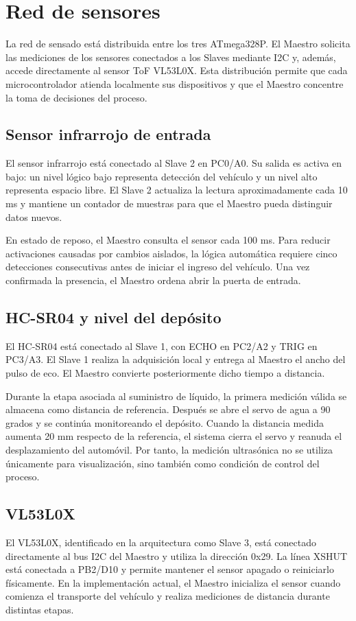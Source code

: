 \section{Red de sensores}

La red de sensado está distribuida entre los tres ATmega328P. El Maestro solicita las mediciones de los sensores conectados a los Slaves mediante I2C y, además, accede directamente al sensor ToF VL53L0X. Esta distribución permite que cada microcontrolador atienda localmente sus dispositivos y que el Maestro concentre la toma de decisiones del proceso.

\subsection{Sensor infrarrojo de entrada}
El sensor infrarrojo está conectado al Slave 2 en PC0/A0. Su salida es activa en bajo: un nivel lógico bajo representa detección del vehículo y un nivel alto representa espacio libre. El Slave 2 actualiza la lectura aproximadamente cada 10 ms y mantiene un contador de muestras para que el Maestro pueda distinguir datos nuevos.

En estado de reposo, el Maestro consulta el sensor cada 100 ms. Para reducir activaciones causadas por cambios aislados, la lógica automática requiere cinco detecciones consecutivas antes de iniciar el ingreso del vehículo. Una vez confirmada la presencia, el Maestro ordena abrir la puerta de entrada.

\subsection{HC-SR04 y nivel del depósito}
El HC-SR04 está conectado al Slave 1, con ECHO en PC2/A2 y TRIG en PC3/A3. El Slave 1 realiza la adquisición local y entrega al Maestro el ancho del pulso de eco. El Maestro convierte posteriormente dicho tiempo a distancia.

Durante la etapa asociada al suministro de líquido, la primera medición válida se almacena como distancia de referencia. Después se abre el servo de agua a 90 grados y se continúa monitoreando el depósito. Cuando la distancia medida aumenta 20 mm respecto de la referencia, el sistema cierra el servo y reanuda el desplazamiento del automóvil. Por tanto, la medición ultrasónica no se utiliza únicamente para visualización, sino también como condición de control del proceso.

\subsection{VL53L0X}
El VL53L0X, identificado en la arquitectura como Slave 3, está conectado directamente al bus I2C del Maestro y utiliza la dirección 0x29. La línea XSHUT está conectada a PB2/D10 y permite mantener el sensor apagado o reiniciarlo físicamente. En la implementación actual, el Maestro inicializa el sensor cuando comienza el transporte del vehículo y realiza mediciones de distancia durante distintas etapas.

